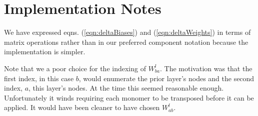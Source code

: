 \documentclass[twocolumn]{revtex4-1}
\begin{document}
\section{Implementation Notes}
We have expressed eqns. (\ref{eqn:deltaBiases}) and (\ref{eqn:deltaWeights}) in terms of matrix operations rather than in our preferred component notation because the implementation is simpler.

Note that we a poor choice for the indexing of $W^l_{b a}$. The motivation was that the first index, in this case $b$, would enumerate the prior layer's nodes and the second index, $a$, this layer's nodes. At the time this seemed reasonable enough. Unfortunately it winds requiring each monomer to be transposed before it can be applied. It would have been cleaner to have chosen $W^l_{a b}$.
\end{document}
